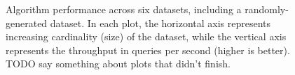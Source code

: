 \begin{figure}
\begin{subfigure}[b]{0.47\textwidth}
\label{fig:results:radioml-scaling}
\end{subfigure}%



\caption{Algorithm performance across six datasets, including a randomly-generated dataset. In each plot, the horizontal axis represents increasing cardinality (size) of the dataset, while the vertical axis represents the throughput in queries per second (higher is better). TODO say something about plots that didn't finish.}
\end{figure}

% 




% 

% 


